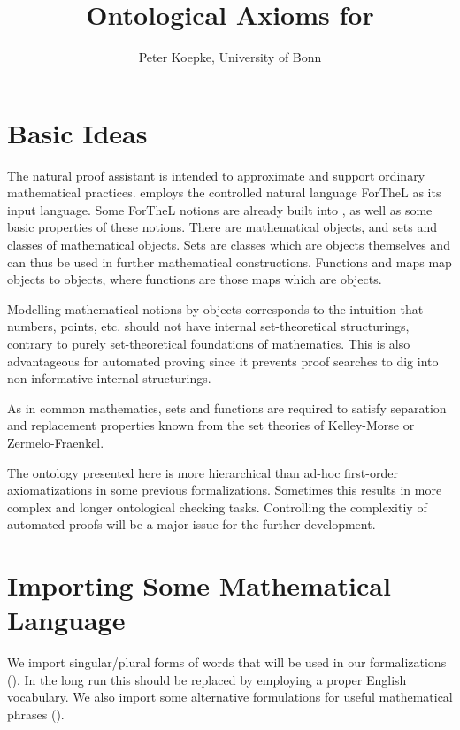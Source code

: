 \documentclass[english,11pt]{article}
\author{Peter Koepke, University of Bonn}
\title{Ontological Axioms for \Naproche}
\begin{document}
\maketitle

\section{Basic Ideas}

The natural proof assistant \Naproche is intended to
approximate and support ordinary mathematical practices.
\Naproche employs the controlled natural language ForTheL
as its input language. Some ForTheL notions are already
built into \Naproche, as well as some basic properties of
these notions.
There are
mathematical objects, and sets and classes of mathematical
objects. Sets are classes which are objects themselves and
can thus be used in further mathematical constructions. Functions
and maps map objects to objects, where functions are those
maps which are objects.

Modelling mathematical notions by objects corresponds
to the intuition that numbers, points, etc. should
not have internal set-theoretical
structurings, contrary to purely set-theoretical
foundations of mathematics. This is also advantageous
for automated proving since it prevents proof searches to
dig into non-informative internal structurings.

As in common mathematics, sets and functions are required to
satisfy separation and replacement properties known from the
set theories of Kelley-Morse or Zermelo-Fraenkel.

The ontology presented here is more hierarchical than
ad-hoc first-order axiomatizations in some previous
\Naproche formalizations. Sometimes
this results in more complex and longer ontological checking tasks.
Controlling the complexitiy of automated proofs will be a major
issue for the further development.


\section{Importing Some Mathematical Language}

We import singular/plural forms of words that will be used in
our formalizations ().
In the long run this should be replaced by
employing a proper English vocabulary. We also
import some alternative formulations for
useful mathematical phrases ().
\end{document}
